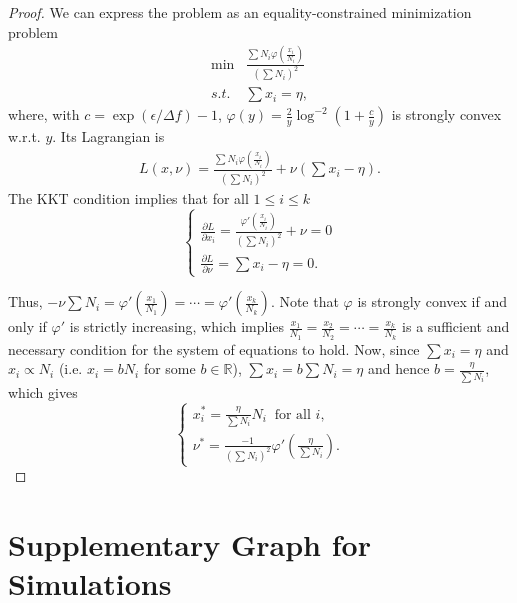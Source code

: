 \documentclass{article}
\theoremstyle{definition}
\begin{document}
\closedFormSolutionPureDP*

\begin{proof}
We can express the problem as an equality-constrained minimization problem
\begin{align*}
    \min& \frac{\sum N_i \varphi(\frac{x_i}{N_i})}{(\sum N_i)^2}\\
    s.t.& \sum x_i = \eta,
\end{align*}
where, with $c = \exp{(\epsilon / \Delta f)}-1$, $\varphi (y) = \frac{2}{y} \log^{-2} \left( 1+ \frac{c}{y} \right)$ is strongly convex w.r.t. $y$. Its Lagrangian is
\begin{align*}
    L(x, \nu) = \frac{\sum N_i \varphi (\frac{x_i}{N_i})}{(\sum N_i)^2} + \nu (\sum x_i - \eta).
\end{align*}
The KKT condition implies that for all $ 1\leq i \leq k$
\begin{equation*}
    \begin{cases}
        \frac{\partial L}{\partial x_i} = \frac{ \varphi'(\frac{x_i}{N_i}) }{(\sum N_i)^2} + \nu = 0 \\
        \frac{\partial L}{\partial \nu} = \sum x_i - \eta = 0.
    \end{cases}
\end{equation*}

Thus, $-\nu \sum N_i = \varphi'(\frac{x_1}{N_1}) = \cdots = \varphi'(\frac{x_k}{N_k})$. Note that $\varphi$ is strongly convex if and only if $\varphi'$ is strictly increasing, which implies $\frac{x_1}{N_1} = \frac{x_2}{N_2} = \cdots = \frac{x_k}{N_k}$ is a sufficient and necessary condition for the system of equations to hold. Now, since $\sum x_i = \eta$ and $x_i \propto N_i$ (i.e. $x_i = b N_i$ for some $b \in \mathbb{R}$), $\sum x_i = b \sum N_i = \eta$ and hence $b = \frac{\eta}{\sum N_i}$, which gives
\begin{equation*}
    \begin{cases}
        x_i^* = \frac{\eta}{\sum N_i} N_i \ \text{ for all }i, \\
        \nu^* = \frac{-1}{(\sum N_i)^2} \varphi'(\frac{\eta}{\sum N_i}).
    \end{cases}
\end{equation*}
\end{proof}

\section{Supplementary Graph for Simulations}
\end{document}
